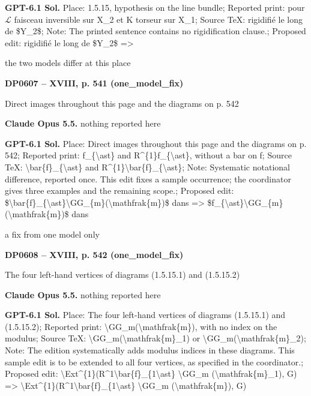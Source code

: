 \textbf{GPT-6.1 Sol.} Place: 1.5.15, hypothesis on the line bundle; Reported print: pour \ensuremath{\mathcal{L}} faisceau inversible sur X\_2 et K torseur sur X\_1; Source TeX: rigidifié le long de \$Y\_2\$; Note: The printed sentence contains no rigidification clause.; Proposed edit:  rigidifié le long de \$Y\_2\$ =\allowbreak > \par
the two models differ at this place\par
\par\noindent\hypertarget{DP0607}{}\textbf{DP0607 -- XVIII, p. 541 (one\_model\_fix)}\par
Direct images throughout this page and the diagrams on p. 542\par
\textbf{Claude Opus 5.5.} nothing reported here\par
\textbf{GPT-6.1 Sol.} Place: Direct images throughout this page and the diagrams on p. 542; Reported print: f\_\{\textbackslash{}ast\} and R\textasciicircum{}\{1\}f\_\{\textbackslash{}ast\}, without a bar on f; Source TeX: \textbackslash{}bar\{f\}\_\{\textbackslash{}ast\} and R\textasciicircum{}\{1\}\textbackslash{}bar\{f\}\_\{\textbackslash{}ast\}; Note: Systematic notational difference, reported once. This edit fixes a sample occurrence; the coordinator gives three examples and the remaining scope.; Proposed edit: \$\textbackslash{}bar\{f\}\_\{\textbackslash{}ast\}\textbackslash{}GG\_\{m\}(\textbackslash{}mathfrak\{m\})\$ dans =\allowbreak > \$f\_\{\textbackslash{}ast\}\textbackslash{}GG\_\{m\}(\textbackslash{}mathfrak\{m\})\$ dans\par
a fix from one model only\par
\par\noindent\hypertarget{DP0608}{}\textbf{DP0608 -- XVIII, p. 542 (one\_model\_fix)}\par
The four left-hand vertices of diagrams (1.5.15.1) and (1.5.15.2)\par
\textbf{Claude Opus 5.5.} nothing reported here\par
\textbf{GPT-6.1 Sol.} Place: The four left-hand vertices of diagrams (1.5.15.1) and (1.5.15.2); Reported print: \textbackslash{}GG\_m(\textbackslash{}mathfrak\{m\}), with no index on the modulus; Source TeX: \textbackslash{}GG\_m(\textbackslash{}mathfrak\{m\}\_1) or \textbackslash{}GG\_m(\textbackslash{}mathfrak\{m\}\_2); Note: The edition systematically adds modulus indices in these diagrams. This sample edit is to be extended to all four vertices, as specified in the coordinator.; Proposed edit: \textbackslash{}Ext\textasciicircum{}\{1\}(R\textasciicircum{}1\textbackslash{}bar\{f\}\_\{1\textbackslash{}ast\} \textbackslash{}GG\_m (\textbackslash{}mathfrak\{m\}\_1), G) =\allowbreak > \textbackslash{}Ext\textasciicircum{}\{1\}(R\textasciicircum{}1\textbackslash{}bar\{f\}\_\{1\textbackslash{}ast\} \textbackslash{}GG\_m (\textbackslash{}mathfrak\{m\}), G)\par
